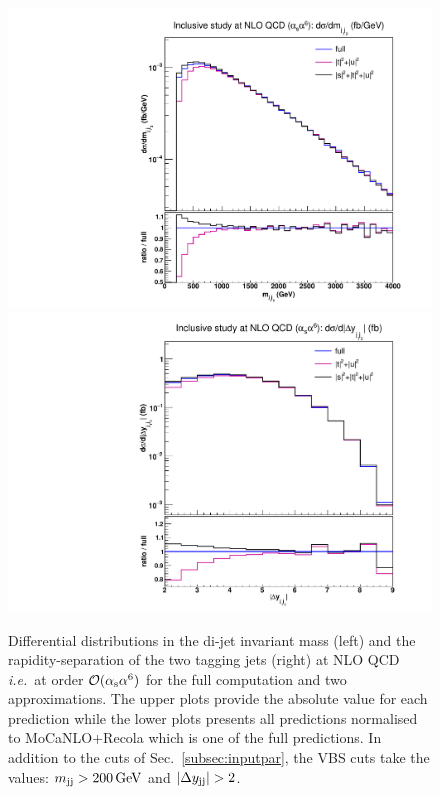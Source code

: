 \begin{figure}[hbt]
\centering
{\includegraphics[scale=0.35]{figures/scanfigures/mjj_nlo.pdf}}
{\includegraphics[scale=0.35]{figures/scanfigures/dyjj_nlo.pdf}}
\caption{
Differential distributions in the di-jet invariant mass (left) and the rapidity-separation of the two tagging jets (right) at NLO QCD \emph{i.e.}\ at order $\mathcal{O}(\alpha_\text{s}\alpha^6)$ for the full computation and two approximations.
The upper plots provide the absolute value for each prediction while the lower plots presents all predictions normalised to {\sc MoCaNLO}+{\sc Recola} which is one of the full predictions.
In addition to the cuts of Sec.~\ref{subsec:inputpar}, the VBS cuts take the values: $m_{\text{j}\text{j}}>200 \,\text{GeV}$ and $|\Delta y_{\Pj\Pj}|>2$.} 
\label{fig:mjjdyjj_1d_1}
\end{figure}


